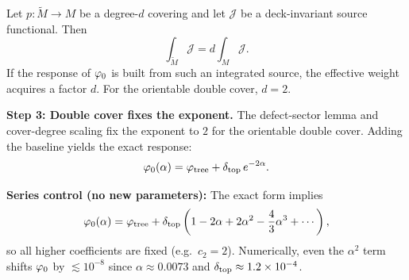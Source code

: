 \begin{tcolorbox}[colback=blue!3, colframe=blue!40, 
    title={\textbf{Lemma (Cover-Degree Scaling of Deck-Invariant Response)}}, fonttitle=\bfseries\small]
Let $p:\widetilde{M}\to M$ be a degree-$d$ covering and let $\mathcal{J}$ be a deck-invariant
source functional. Then
\begin{equation}
    \int_{\widetilde{M}}\mathcal{J} = d \int_{M}\mathcal{J}.
\end{equation}
If the response of $\varphi_0$ is built from such an integrated source, the effective
weight acquires a factor $d$. For the orientable double cover, $d=2$.
\end{tcolorbox}

\textbf{Step 3: Double cover fixes the exponent.}
The defect-sector lemma and cover-degree scaling fix the exponent to $2$ for the
orientable double cover. Adding the baseline yields the exact response:
\begin{equation}
    \varphi_0(\alpha) = \varphi_{\mathrm{tree}} + \delta_{\mathrm{top}}\,e^{-2\alpha}.
\end{equation}

\begin{remark}
\textbf{Series control (no new parameters):} The exact form implies
\begin{equation}
    \varphi_0(\alpha)=\varphi_{\mathrm{tree}}+\delta_{\mathrm{top}}\left(1-2\alpha+2\alpha^2-\frac{4}{3}\alpha^3+\cdots\right),
\end{equation}
so all higher coefficients are fixed (e.g.\ $c_2=2$). Numerically, even the
$\alpha^2$ term shifts $\varphi_0$ by $\lesssim 10^{-8}$ since
$\alpha\approx 0.0073$ and $\delta_{\mathrm{top}}\approx 1.2\times10^{-4}$.
\end{remark}


